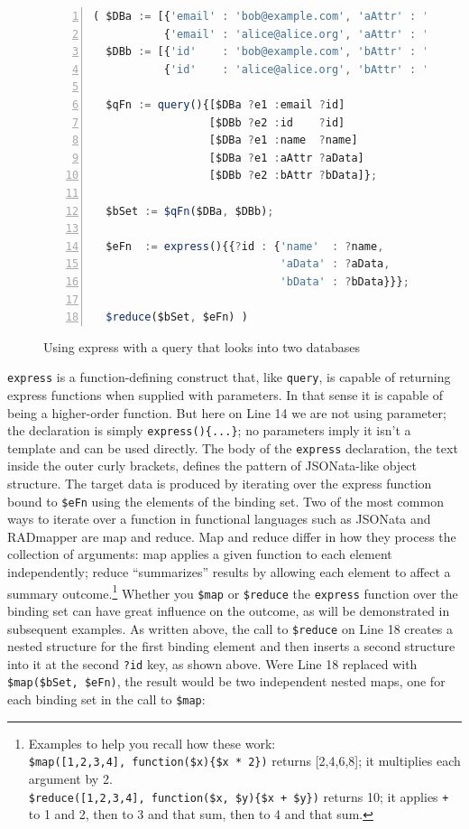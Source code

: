 \documentclass[10pt,letterpaper]{article} %
\newcommand{\stt}[1]{\texttt{#1}} %
\begin{document}
\begin{figure}[H]
    \caption{Using express with a query that looks into two databases}
    \label{code:two-database-query-express}
\begin{lstlisting}[language=JavaScript,numberstyle=\scriptsize,basicstyle=\ttfamily\scriptsize,numbers=left,stepnumber=1,breaklines=true]
( $DBa := [{'email' : 'bob@example.com', 'aAttr' : 'Bob-A-data',   'name' : 'Bob'},
           {'email' : 'alice@alice.org', 'aAttr' : 'Alice-A-data', 'name' : 'Alice'}];
  $DBb := [{'id'    : 'bob@example.com', 'bAttr' : 'Bob-B-data'},
           {'id'    : 'alice@alice.org', 'bAttr' : 'Alice-B-data'}];

  $qFn := query(){[$DBa ?e1 :email ?id]
                  [$DBb ?e2 :id    ?id]
                  [$DBa ?e1 :name  ?name]
                  [$DBa ?e1 :aAttr ?aData]
                  [$DBb ?e2 :bAttr ?bData]};

  $bSet := $qFn($DBa, $DBb);

  $eFn  := express(){{?id : {'name'  : ?name,
                             'aData' : ?aData,
                             'bData' : ?bData}}};

  $reduce($bSet, $eFn) )
\end{lstlisting}
\end{figure} \vspace{-2em}

\stt{express} is a function-defining construct that, like \stt{query}, is capable of returning express functions when supplied with parameters.
In that sense it is capable of being a higher-order function.
But here on Line 14 we are not using parameter; the declaration is simply \stt{express()\{...\}}; no parameters imply it isn't a template and can be used directly.
The body of the \stt{express} declaration, the text inside the outer curly brackets, defines the pattern of JSONata-like object structure.
The target data is produced by iterating over the express function bound to \stt{\$eFn} using the elements of the binding set.
Two of the most common ways to iterate over a function in functional languages such as JSONata and RADmapper are map and reduce.
Map and reduce differ in how they process the collection of arguments:
map applies a given function to each element independently;
reduce ``summarizes'' results by allowing each element to affect a summary outcome.\footnote{Examples to help you recall how these work:
  \\ \stt{\$map([1,2,3,4], function(\$x)\{\$x * 2\})} returns [2,4,6,8]; it multiplies each argument by 2.
  \\ \stt{\$reduce([1,2,3,4], function(\$x, \$y)\{\$x + \$y\})} returns 10; it applies \stt{+} to 1 and 2, then to 3 and that sum,
  then to 4 and that sum.}
Whether you \stt{\$map} or \stt{\$reduce} the \stt{express} function over the binding set can have great influence on the outcome, as will be demonstrated in subsequent examples.
As written above, the call to \stt{\$reduce} on Line 18 creates a nested structure for the first binding element and then inserts a second structure into it at the second \stt{?id} key, as shown above.
Were Line 18 replaced with \stt{\$map(\$bSet, \$eFn)}, the result would be two independent nested maps, one for each binding set in the call to \stt{\$map}:
\end{document}
